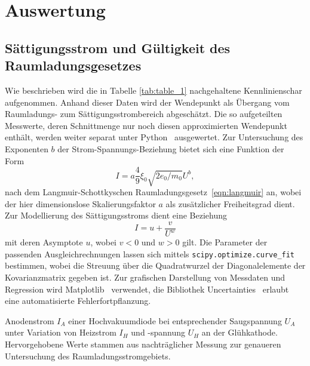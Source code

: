 \section{Auswertung}
\label{sec:auswertung}

\subsection{Sättigungsstrom und Gültigkeit des Raumladungsgesetzes}

Wie beschrieben wird die in Tabelle \ref{tab:table_1} nachgehaltene Kennlinienschar aufgenommen. Anhand dieser Daten
wird der Wendepunkt als Übergang vom Raumladungs- zum Sättigungsstrombereich abgeschätzt. Die so aufgeteilten Messwerte, deren
Schnittmenge nur noch diesen approximierten Wendepunkt enthält, werden weiter separat unter Python~\cite{python} ausgewertet. Zur
Untersuchung des Exponenten $b$ der Strom-Spannungs-Beziehung bietet sich eine Funktion der Form
\begin{equation}
    I = a \frac{4}{9} \xi_0 \sqrt{2 e_0/m_0} U^b ,
	\label{eqn:fit_1}
\end{equation}
nach dem Langmuir-Schottkyschen Raumladungsgesetz~\eqref{eqn:langmuir} an, wobei der hier dimensionslose Skalierungsfaktor $a$
als zusätzlicher Freiheitsgrad dient. Zur Modellierung des Sättigungsstroms dient eine Beziehung
\begin{equation}
	I = u + \frac{v}{U^w}
	\label{eqn:fit_2}
\end{equation}
mit deren Asymptote $u$, wobei $v < 0$ und $w > 0$ gilt. Die Parameter der passenden Ausgleichrechnungen lassen sich mittels
\verb+scipy.optimize.curve_fit+~\cite{scipy} bestimmen, wobei die Streuung über die Quadratwurzel der Diagonalelemente der
Kovarianzmatrix gegeben ist. Zur grafischen Darstellung von Messdaten und Regression wird Matplotlib~\cite{matplotlib} verwendet,
die Bibliothek Uncertainties~\cite{uncertainties} erlaubt eine automatisierte Fehlerfortpflanzung.

\begin{table}[H]
	\caption{Anodenstrom $I_A$ einer Hochvakuumdiode bei entsprechender Saugspannung $U_A$ unter Variation von
			 Heizstrom $I_H$ und -spannung $U_H$ an der Glühkathode. Hervorgehobene Werte stammen aus nachträglicher
			 Messung zur genaueren Untersuchung des Raumladungsstromgebiets.}
	\centering
	
	\label{tab:table_1}
\end{table}

